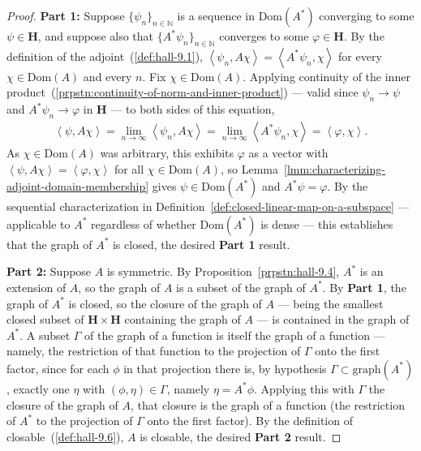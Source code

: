 \begin{proof}
    \leanok
\textbf{Part 1:} Suppose $\{ \psi_n \}_{n \in \mathbb{N}}$ is a sequence in $\text{Dom}(A^*)$ converging to some $\psi \in \mathbf{H}$, and suppose also that $\{ A^*\psi_n \}_{n \in \mathbb{N}}$ converges to some $\varphi \in \mathbf{H}$. By the definition of the adjoint~(\ref{def:hall-9.1}), $\left< \psi_n, A\chi \right> = \left< A^*\psi_n, \chi \right>$ for every $\chi \in \text{Dom}(A)$ and every $n$. Fix $\chi \in \text{Dom}(A)$. Applying continuity of the inner product~(\ref{prpstn:continuity-of-norm-and-inner-product}) — valid since $\psi_n \to \psi$ and $A^*\psi_n \to \varphi$ in $\mathbf{H}$ — to both sides of this equation,
\begin{align}
    \left< \psi, A\chi \right> = \lim_{n \to \infty} \left< \psi_n, A\chi \right> = \lim_{n \to \infty} \left< A^*\psi_n, \chi \right> = \left< \varphi, \chi \right>.
\end{align}
As $\chi \in \text{Dom}(A)$ was arbitrary, this exhibits $\varphi$ as a vector with $\left< \psi, A\chi \right> = \left< \varphi, \chi \right>$ for all $\chi \in \text{Dom}(A)$, so Lemma~\ref{lmm:characterizing-adjoint-domain-membership} gives $\psi \in \text{Dom}(A^*)$ and $A^*\psi = \varphi$. By the sequential characterization in Definition~\ref{def:closed-linear-map-on-a-subspace} — applicable to $A^*$ regardless of whether $\text{Dom}(A^*)$ is dense — this establishes that the graph of $A^*$ is closed, the desired \textbf{Part 1} result.

\textbf{Part 2:} Suppose $A$ is symmetric. By Proposition~\ref{prpstn:hall-9.4}, $A^*$ is an extension of $A$, so the graph of $A$ is a subset of the graph of $A^*$. By \textbf{Part 1}, the graph of $A^*$ is closed, so the closure of the graph of $A$ — being the smallest closed subset of $\mathbf{H} \times \mathbf{H}$ containing the graph of $A$ — is contained in the graph of $A^*$. A subset $\Gamma$ of the graph of a function is itself the graph of a function — namely, the restriction of that function to the projection of $\Gamma$ onto the first factor, since for each $\phi$ in that projection there is, by hypothesis $\Gamma \subset \text{graph}(A^*)$, exactly one $\eta$ with $(\phi,\eta) \in \Gamma$, namely $\eta = A^*\phi$. Applying this with $\Gamma$ the closure of the graph of $A$, that closure is the graph of a function (the restriction of $A^*$ to the projection of $\Gamma$ onto the first factor). By the definition of closable~(\ref{def:hall-9.6}), $A$ is closable, the desired \textbf{Part 2} result.
\end{proof}

